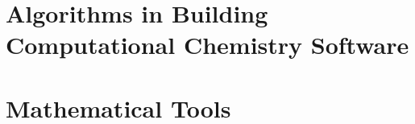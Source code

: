 \documentclass[a4paper,12pt,oneside]{book}
\theoremstyle{definition}\newtheorem{law}{Law}
\theoremstyle{plain}\newtheorem{theorem}{Theorem}
\theoremstyle{remark}\newtheorem{remark}{Remark}
\theoremstyle{axiom}\newtheorem{axiom}{Axiom}
\numberwithin{law}{chapter}
\numberwithin{theorem}{chapter}
\numberwithin{remark}{chapter}
\begin{document}

\part{Algorithms in Building Computational Chemistry Software}


%
%
%
%
%
%
%

\part{Mathematical Tools}
%
%
%






%



\end{document}

